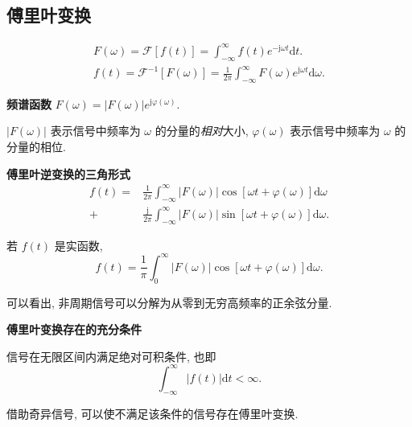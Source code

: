 \subsection{傅里叶变换} \label{3 傅里叶变换}
\rmg
\begin{gather}
    F(\omega)=\mathcal{F}[f(t)]=\int_{-\infty}^{\infty}f(t)e^{-\mathrm{j}\omega t}\mathrm{d}t. \label{eq:3.3 fourier} \\
    f(t)=\mathcal{F}^{-1}[F(\omega)]=\frac{1}{2\pi}\int_{-\infty}^{\infty}F(\omega)e^{\mathrm{j}\omega t}\mathrm{d}\omega.
\end{gather}

\textbf{频谱函数} $F(\omega)=|F(\omega)|e^{\mathrm{j}\varphi(\omega)}$.

$|F(\omega)|$ 表示信号中频率为 $\omega$ 的分量的\textit{相对}大小, $\varphi(\omega)$ 表示信号中频率为 $\omega$ 的分量的相位.

\textbf{傅里叶逆变换的三角形式}
\begin{equation}
    \begin{aligned}
        f(t)= & \frac{1}{2\pi}\int_{-\infty}^{\infty}|F(\omega)|\cos[\omega t+\varphi(\omega)]\mathrm{d}\omega           \\
        +     & \frac{\mathrm{j}}{2\pi}\int_{-\infty}^{\infty}|F(\omega)|\sin[\omega t+\varphi(\omega)]\mathrm{d}\omega.
    \end{aligned}
\end{equation}

若 $f(t)$ 是实函数,
\begin{equation}
    f(t)=\frac{1}{\pi}\int_{0}^{\infty}|F(\omega)|\cos[\omega t+\varphi(\omega)]\mathrm{d}\omega.
\end{equation}

可以看出, 非周期信号可以分解为从零到无穷高频率的正余弦分量.

\textbf{傅里叶变换存在的充分条件}

信号在无限区间内满足绝对可积条件, 也即
\begin{equation}
    \int_{-\infty}^{\infty}|f(t)|\mathrm{d}t<\infty.
\end{equation}

借助奇异信号, 可以使不满足该条件的信号存在傅里叶变换.
